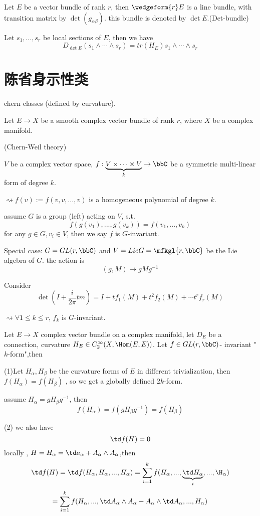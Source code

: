 Let $E$ be a vector bundle of rank $r$,
then $\wedgeform{r}E$ is a line bundle,
with transition matrix by $\det(g_{\alpha\beta})$.
this bundle is denoted by $\det E$.(Det-bundle)

Let $s_1,...,s_r$ be local sections of $E$,
then we have
$$D_{\det E}(s_1\wedge\cdots\wedge s_r)= tr(H_E)s_1\wedge\cdots\wedge s_r$$

\section{陈省身示性类}
chern classes (defined by curvature).

Let $E\to X$ be a smooth complex vector bundle of rank $r$,
where $X$ be a complex manifold.

(Chern-Weil theory)

$V$ be a complex vector space, $f:\underbrace{V\times\cdots\times V}_k\to \bbC$
be a symmetric multi-linear form of degree $k$.

$\rightsquigarrow f(v):=f(v,v,...,v)$ is a homogeneous polynomial of degree $k$.
\begin{definition}
assume $G$ is a group (left) acting on $V$, s.t.
$$f(g(v_1),...,g(v_k))=f(v_1,...,v_k)$$
for any $g\in G,v_i\in V$, then we say $f$ is $G$-invariant.
\end{definition}

Special case: $G=GL(r,\bbC)$ and $V=Lie G=\mfkgl{r,\bbC}$ be the Lie algebra of $G$.
the action is
$$(g,M)\mapsto gMg^{-1}$$

Consider
$$\det(I+\frac{i}{2\pi}tm)=I+tf_1(M)+t^2f_2(M)+\cdots t^rf_r(M)$$

$\rightsquigarrow\forall 1\leq k\leq r$, $f_k$ is $G$-invariant.

Let $E\to X$ complex vector bundle on a complex manifold,
let $D_E$ be a connection,
curvature $H_E\in C_2^\infty(X,\Hom(E,E))$.
 Let $f\in GL(r,\bbC)$- invariant "$k$-form",then

(1)Let $H_{\alpha},H_{\beta}$ be the curvature forms of $E$ in different trivialization,
then $f(H_\alpha)=f(H_{\beta})$ , so we get a globally defined $2k$-form.

assume $H_\alpha=gH_\beta g^{-1}$, then
$$f(H_\alpha)=f(g H_\beta g^{-1})=f(H_\beta)$$

(2) we also have
$$\td f(H)=0$$
locally , $H=H_\alpha=\td a_\alpha+A_\alpha\wedge A_\alpha$,then
$$\td f(H)=\td f(H_\alpha,H_\alpha,...,H_\alpha)
=\sum_{i=1}^kf(H_\alpha,...,\underbrace{\td H_\alpha}_{i},...,\H_\alpha)$$
$$
=\sum_{i=1}^kf(H_\alpha,...,\td A_\alpha\wedge A_\alpha-A_\alpha\wedge\td A_\alpha,...,H_\alpha)
$$

